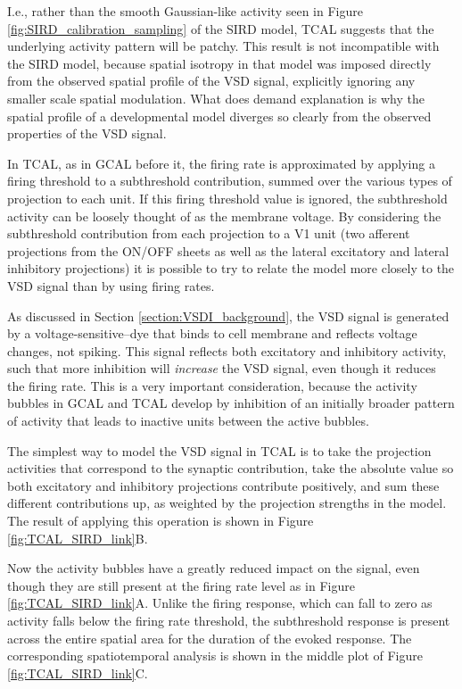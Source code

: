 \documentclass[phd,ianc,twoside]{infthesis}
\begin{document}
I.e., rather than the smooth Gaussian-like activity seen in Figure
\ref{fig:SIRD_calibration_sampling} of the SIRD model, TCAL suggests
that the underlying activity pattern will be patchy.  This result is
not incompatible with the SIRD model, because spatial isotropy in that model
was imposed directly from the observed spatial profile of the VSD
signal, explicitly ignoring any smaller scale spatial modulation. What
does demand explanation is why the spatial profile of a developmental
model diverges so clearly from the observed properties of the VSD signal.

In TCAL, as in GCAL before it, the firing rate is approximated by
applying a firing threshold to a subthreshold contribution, summed over
the various types of projection to each unit. If this firing threshold
value is ignored, the subthreshold activity can be loosely thought of as
the membrane voltage. By considering the subthreshold contribution from
each projection to a V1 unit (two afferent projections from the ON/OFF
sheets as well as the lateral excitatory and lateral inhibitory
projections) it is possible to try to relate the model more closely to
the VSD signal than by using firing rates.

As discussed in Section \ref{section:VSDI_background}, the VSD signal
is generated by a voltage-sensitive--dye that binds to cell membrane
and reflects voltage changes, not spiking. This signal reflects both
excitatory and inhibitory activity, such that more inhibition will
\emph{increase} the VSD signal, even though it reduces the firing
rate.  This is a very important consideration, because the activity
bubbles in GCAL and TCAL develop by inhibition of an initially broader
pattern of activity that leads to inactive units between the active
bubbles. 

The simplest way to model the VSD signal in TCAL is to take the projection
activities that correspond to the synaptic contribution, take the
absolute value so both excitatory and inhibitory projections contribute
positively, and sum these different contributions up, as weighted by the
projection strengths in the model. The result of applying this operation
is shown in Figure \ref{fig:TCAL_SIRD_link}B.

Now the activity bubbles have a greatly reduced impact on the signal,
even though they are still present at the firing rate level as in Figure
\ref{fig:TCAL_SIRD_link}A. Unlike the firing response, which can fall to
zero as activity falls below the firing rate threshold, the subthreshold
response is present across the entire spatial area for the duration of
the evoked response. The corresponding spatiotemporal analysis is shown
in the middle plot of Figure \ref{fig:TCAL_SIRD_link}C.
\end{document}
